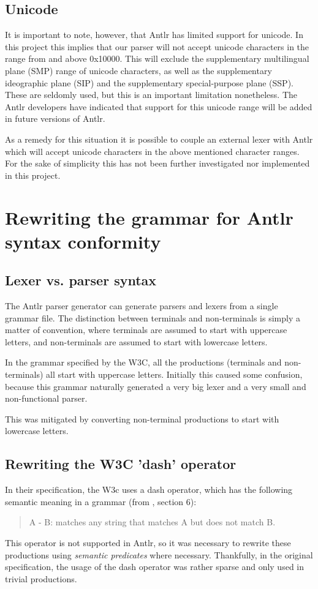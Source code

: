 \subsection{Unicode}
It is important to note, however, that Antlr has limited support for unicode.
In this project this implies that our parser will not accept unicode characters
in the range from and above 0x10000. This will exclude the supplementary
multilingual plane (SMP) range of unicode characters, as well as the
supplementary ideographic plane (SIP) and the supplementary special-purpose
plane (SSP). These are seldomly used, but this is an important limitation
nonetheless. The Antlr developers have indicated that support for this unicode
range will be added in future versions of Antlr.

As a remedy for this situation it is possible to couple an external lexer with
Antlr which will accept unicode characters in the above mentioned character
ranges. For the sake of simplicity this has not been further investigated nor
implemented in this project.

\section{Rewriting the grammar for Antlr syntax conformity}
\subsection{Lexer vs. parser syntax}
The Antlr parser generator can generate parsers and lexers from a single grammar
file. The distinction between terminals and non-terminals is simply a matter of
convention, where terminals are assumed to start with uppercase letters, and
non-terminals are assumed to start with lowercase letters.

In the grammar specified by the W3C, all the productions (terminals and
non-terminals) all start with uppercase letters. Initially this caused some
confusion, because this grammar naturally generated a very big lexer and a very
small and non-functional parser.

This was mitigated by converting non-terminal productions to start with
lowercase letters.

\subsection{Rewriting the W3C 'dash' operator}
In their specification, the W3c uses a dash operator, which has the following
semantic meaning in a grammar (from \cite{w3c03}, section 6):
\begin{quote}
A - B: matches any string that matches A but does not match B.
\end{quote}
This operator is not supported in Antlr, so it was necessary to rewrite
these productions using \emph{semantic predicates} where necessary. Thankfully,
in the original specification, the usage of the dash operator was rather sparse
and only used in trivial productions.

